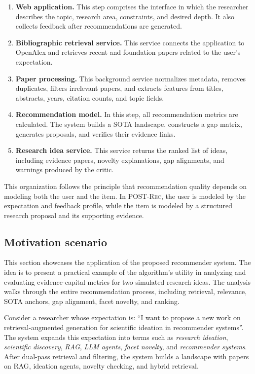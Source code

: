\documentclass[preprint,12pt]{elsarticle}
\begin{document}
\begin{enumerate}
  \item \textbf{Web application.} This step comprises the interface in which the researcher describes the topic, research area, constraints, and desired depth. It also collects feedback after recommendations are generated.
  \item \textbf{Bibliographic retrieval service.} This service connects the application to OpenAlex and retrieves recent and foundation papers related to the user's expectation.
  \item \textbf{Paper processing.} This background service normalizes metadata, removes duplicates, filters irrelevant papers, and extracts features from titles, abstracts, years, citation counts, and topic fields.
  \item \textbf{Recommendation model.} In this step, all recommendation metrics are calculated. The system builds a SOTA landscape, constructs a gap matrix, generates proposals, and verifies their evidence links.
  \item \textbf{Research idea service.} This service returns the ranked list of ideas, including evidence papers, novelty explanations, gap alignments, and warnings produced by the critic.
\end{enumerate}

This organization follows the principle that recommendation quality depends on modeling both the user and the item. In \textsc{POST-Rec}, the user is modeled by the expectation and feedback profile, while the item is modeled by a structured research proposal and its supporting evidence.

\subsection{Motivation scenario}
\label{subsec:scenario}

This section showcases the application of the proposed recommender system. The idea is to present a practical example of the algorithm's utility in analyzing and evaluating evidence-capital metrics for two simulated research ideas. The analysis walks through the entire recommendation process, including retrieval, relevance, SOTA anchors, gap alignment, facet novelty, and ranking.

Consider a researcher whose expectation is: ``I want to propose a new work on retrieval-augmented generation for scientific ideation in recommender systems''. The system expands this expectation into terms such as \emph{research ideation}, \emph{scientific discovery}, \emph{RAG}, \emph{LLM agents}, \emph{facet novelty}, and \emph{recommender systems}. After dual-pass retrieval and filtering, the system builds a landscape with papers on RAG, ideation agents, novelty checking, and hybrid retrieval.
\end{document}
